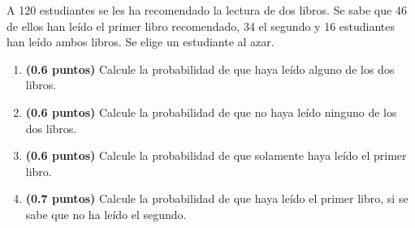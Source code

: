 
A 120 estudiantes se les ha recomendado la lectura de dos libros. Se sabe
que 46 de ellos han leído el primer libro recomendado, 34 el segundo y 16
estudiantes han leído ambos libros. Se elige un estudiante al azar.
\begin{enumerate}[label=\alph*)]
  \item \textbf{(0.6 puntos)} Calcule la probabilidad de que haya leído alguno
  de los dos libros.
  \item \textbf{(0.6 puntos)} Calcule la probabilidad de que no haya leído
  ninguno de los dos libros.
  \item \textbf{(0.6 puntos)} Calcule la probabilidad de que solamente haya
  leído el primer libro.
  \item \textbf{(0.7 puntos)} Calcule la probabilidad de que haya leído el
  primer libro, si se sabe que no ha leído el segundo.
\end{enumerate}
